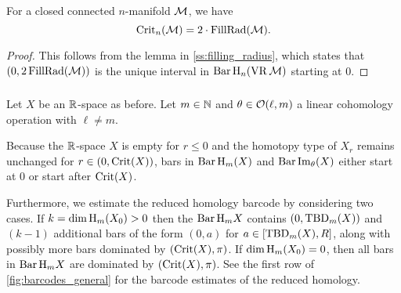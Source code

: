 \subsubsection{}\label{l:crit_val and fill_rad 1}

\lemma For a closed connected $n$-manifold $\mathcal{M}$, we have
\[
\operatorname{Crit}_n(\mathcal{M}) = 2 \cdot \operatorname{FillRad}(\mathcal{M}).
\]

\begin{proof}
	This follows from the lemma in \cref{ss:filling_radius}, which states that \((0,2\operatorname{FillRad}(\mathcal{M}))\) is the unique interval in \(\operatorname{Bar} \operatorname{H}_{n}(\operatorname{VR} \mathcal{M})\) starting at $0$.
\end{proof}


\subsubsection{}\label{subsub:barcode_general}

Let $X$ be an $\mathbb{R}$-space as before.
Let \(m \in \mathbb{N}\) and \(\theta \in \mathcal{O}(\ell,m)\) a linear cohomology operation with $\ell \neq m$.

Because the $\mathbb{R}$-space $X$ is empty for \(r \leq 0\) and the homotopy type of $X_r$ remains unchanged for $r \in (0, \operatorname{Crit}(X))$, bars in \(\operatorname{Bar} \mathrm{H}_m(X)\) and $\operatorname{Bar}\operatorname{Im}_\theta(X)$ either start at $0$ or start after $\operatorname{Crit}(X)$.

Furthermore, we estimate the reduced homology barcode by considering two cases.
If \(k = \dim \operatorname{H}_m(X_0) > 0\) then the $\operatorname{Bar}\mathrm{H}_m X$ contains $(0,\mathrm{TBD}_{m}(X))$ and \((k - 1)\) additional bars of the form \((0, a)\) for \(a \in [\mathrm{TBD}_{m}(X), R]\), along with possibly more bars dominated by \((\operatorname{Crit}(X), \pi)\).
If $\dim \operatorname{H}_m(X_0) = 0$, then all bars in $\operatorname{Bar}\mathrm{H}_m X$ are dominated by \((\operatorname{Crit}(X), \pi)\).
See the first row of \cref{fig:barcodes_general} for the barcode estimates of the reduced homology.

